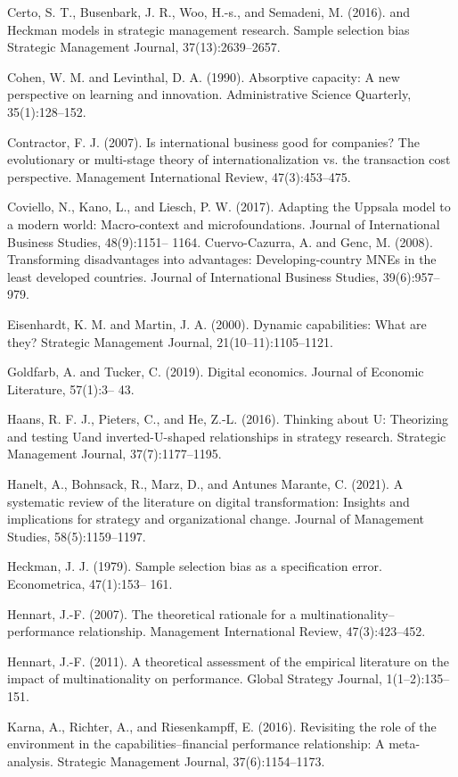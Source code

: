 \documentclass[12pt,a4paper]{article}
\begin{document}
Certo, S. T., Busenbark, J. R., Woo, H.-s., and Semadeni, M. (2016). and
Heckman models in strategic management research. Sample selection bias
Strategic Management Journal, 37(13):2639--2657.

Cohen, W. M. and Levinthal, D. A. (1990). Absorptive capacity: A new
perspective on learning and innovation. Administrative Science
Quarterly, 35(1):128--152.

Contractor, F. J. (2007). Is international business good for companies?
The evolutionary or multi-stage theory of internationalization vs. the
transaction cost perspective. Management International Review,
47(3):453--475.

Coviello, N., Kano, L., and Liesch, P. W. (2017). Adapting the Uppsala
model to a modern world: Macro-context and microfoundations. Journal of
International Business Studies, 48(9):1151-- 1164. Cuervo-Cazurra, A.
and Genc, M. (2008). Transforming disadvantages into advantages:
Developing-country MNEs in the least developed countries. Journal of
International Business Studies, 39(6):957--979.

Eisenhardt, K. M. and Martin, J. A. (2000). Dynamic capabilities: What
are they? Strategic Management Journal, 21(10--11):1105--1121.

Goldfarb, A. and Tucker, C. (2019). Digital economics. Journal of
Economic Literature, 57(1):3-- 43.

Haans, R. F. J., Pieters, C., and He, Z.-L. (2016). Thinking about U:
Theorizing and testing Uand inverted-U-shaped relationships in strategy
research. Strategic Management Journal, 37(7):1177--1195.

Hanelt, A., Bohnsack, R., Marz, D., and Antunes Marante, C. (2021). A
systematic review of the literature on digital transformation: Insights
and implications for strategy and organizational change. Journal of
Management Studies, 58(5):1159--1197.

Heckman, J. J. (1979). Sample selection bias as a specification error.
Econometrica, 47(1):153-- 161.

Hennart, J.-F. (2007). The theoretical rationale for a
multinationality--performance relationship. Management International
Review, 47(3):423--452.

Hennart, J.-F. (2011). A theoretical assessment of the empirical
literature on the impact of multinationality on performance. Global
Strategy Journal, 1(1--2):135--151.

Karna, A., Richter, A., and Riesenkampff, E. (2016). Revisiting the role
of the environment in the capabilities--financial performance
relationship: A meta-analysis. Strategic Management Journal,
37(6):1154--1173.
\end{document}
